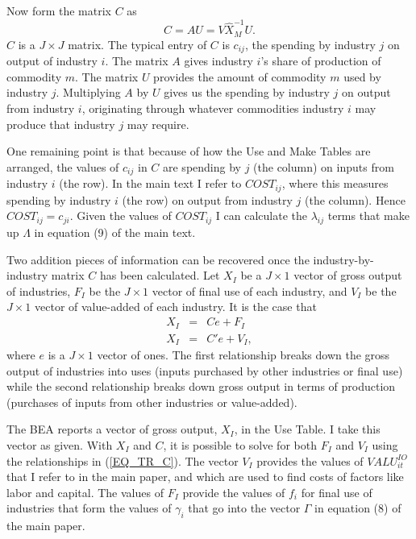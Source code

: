\documentclass[11pt]{article}
\begin{document}
Now form the matrix $C$ as
\begin{equation}
	C = A U =  V \hat{X}_M^{-1} U.
\end{equation}
$C$ is a $J \times J$ matrix. The typical entry of $C$ is $c_{ij}$, the spending by industry $j$ on output of industry $i$. The matrix $A$ gives industry $i$'s share of production of commodity $m$. The matrix $U$ provides the amount of commodity $m$ used by industry $j$. Multiplying $A$ by $U$ gives us the spending by industry $j$ on output from industry $i$, originating through whatever commodities industry $i$ may produce that industry $j$ may require. 

One remaining point is that because of how the Use and Make Tables are arranged, the values of $c_{ij}$ in $C$ are spending by $j$ (the column) on inputs from industry $i$ (the row). In the main text I refer to $COST_{ij}$, where this measures spending by industry $i$ (the row) on output from industry $j$ (the column). Hence $COST_{ij} = c_{ji}$. Given the values of $COST_{ij}$ I can calculate the $\lambda_{ij}$ terms that make up $\Lambda$ in equation (9) of the main text.

Two addition pieces of information can be recovered once the industry-by-industry matrix $C$ has been calculated. Let $X_I$ be a $J \times 1$ vector of gross output of industries, $F_I$ be the $J \times 1$ vector of final use of each industry, and $V_I$ be the $J \times 1$ vector of value-added of each industry. It is the case that
\begin{eqnarray}
	X_I &=& Ce + F_I \\
	X_I &=& C'e + V_I, \label{EQ_TR_C}
\end{eqnarray}
where $e$ is a $J \times 1$ vector of ones. The first relationship breaks down the gross output of industries into uses (inputs purchased by other industries or final use) while the second relationship breaks down gross output in terms of production (purchases of inputs from other industries or value-added). 

The BEA reports a vector of gross output, $X_I$, in the Use Table. I take this vector as given. With $X_I$ and $C$, it is possible to solve for both $F_I$ and $V_I$ using the relationships in (\ref{EQ_TR_C}). The vector $V_I$ provides the values of $VALU_{it}^{IO}$ that I refer to in the main paper, and which are used to find costs of factors like labor and capital. The values of $F_I$ provide the values of $f_i$ for final use of industries that form the values of $\gamma_i$ that go into the vector $\Gamma$ in equation (8) of the main paper.
\end{document}
